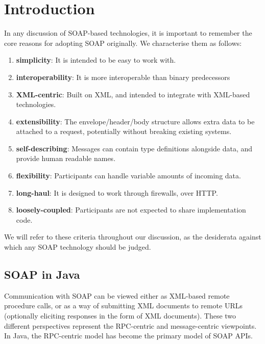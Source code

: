 \section{Introduction}
\label{introduction}

In any discussion of SOAP-based technologies, it is important to
remember the core reasons for adopting SOAP originally. We
characterise them as follows:

\begin{enumerate}
\item \textbf{simplicity}: It is intended to be easy to work with.

\item \textbf{interoperability}: It is more interoperable than binary
predecessors

\item \textbf{XML-centric}: Built on XML, and intended to integrate with
XML-based technologies.

\item \textbf{extensibility}: The envelope/header/body structure
allows extra data to be attached to a request, potentially without
breaking existing systems.

\item \textbf{self-describing}: Messages can contain type definitions
alongside data, and provide human readable names.

\item \textbf{flexibility}: Participants can handle variable amounts
of incoming data.

\item \textbf{long-haul}: It is designed to work through firewalls,
over HTTP.

\item \textbf{loosely-coupled}: Participants are not expected to share
implementation code.
\end{enumerate}

We will refer to these criteria throughout our discussion, as the
desiderata against which any SOAP technology should be judged.

\subsection{SOAP in Java}
\label{intro:java}

Communication with SOAP can be viewed either as XML-based remote
procedure calls, or as a way of submitting XML documents to remote
URLs (optionally eliciting responses in the form of XML
documents). These two different perspectives represent the RPC-centric
and message-centric viewpoints. In Java, the RPC-centric model has
become the primary model of SOAP APIs.


